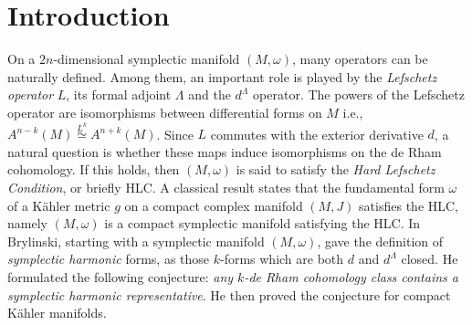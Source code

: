 \documentclass[a4paper, 11pt]{amsart}
\theoremstyle{plain}
\theoremstyle{definition}
\numberwithin{equation}{section}
\begin{document}
\section{Introduction}
On a $2n$-dimensional symplectic manifold $(M, \omega)$, many operators can be naturally defined. Among them, an important role is played by the \textit{Lefschetz operator} $L$, its formal adjoint $\Lambda$ and the $d^{\Lambda}$ operator. The powers of the Lefschetz operator are isomorphisms between differential forms on $M$ i.e., $A^{n-k}(M) \stackrel{L^{k}}{\simeq} A^{n+k}(M)$. Since $L$ commutes with the exterior derivative $d$, a natural question is whether these maps induce isomorphisms on the de Rham cohomology. If this holds, then $(M, \omega)$ is said to satisfy the \textit{Hard Lefschetz Condition}, or briefly HLC. A classical result states that the fundamental form $\omega$ of a K\"ahler metric $g$ on a compact complex manifold $(M,J)$ satisfies the HLC, namely $(M,\omega)$ is a compact symplectic manifold satisfying the HLC. 
\newline
In \cite{Brylinski} Brylinski, starting with a symplectic manifold $(M,\omega)$, gave the definition of {\em symplectic harmonic} forms, as those $k$-forms which are both $d$ and $d^{\Lambda}$ closed. He formulated the following conjecture: {\em any $k$-de Rham cohomology class contains a symplectic harmonic representative}. He then proved the conjecture for compact K\"ahler manifolds.\newline
\end{document}
